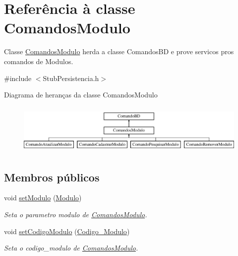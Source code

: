 \hypertarget{class_comandos_modulo}{
\section{\-Referência à classe \-Comandos\-Modulo}
\label{class_comandos_modulo}
}


\-Classe \hyperlink{class_comandos_modulo}{\-Comandos\-Modulo} herda a classe \-Comandos\-B\-D e prove servicos pros comandos de \-Modulos.  




{\ttfamily \#include $<$\-Stub\-Persistencia.\-h$>$}

\-Diagrama de heranças da classe \-Comandos\-Modulo\begin{figure}[H]
\begin{center}
\leavevmode
\includegraphics[height=2.456140cm]{class_comandos_modulo}
\end{center}
\end{figure}
\subsection*{\-Membros públicos}
\begin{DoxyCompactItemize}
\item 
void \hyperlink{class_comandos_modulo_a7518c90fde0ffe5cee985e91124f2955}{set\-Modulo} (\hyperlink{class_modulo}{\-Modulo})
\begin{DoxyCompactList}\small\item\em \-Seta o parametro modulo de \hyperlink{class_comandos_modulo}{\-Comandos\-Modulo}. \end{DoxyCompactList}\item 
void \hyperlink{class_comandos_modulo_a9e4b91e8c55c47700fa1e7dc1cfca94b}{set\-Codigo\-Modulo} (\hyperlink{class_codigo___modulo}{\-Codigo\-\_\-\-Modulo})
\begin{DoxyCompactList}\small\item\em \-Seta o codigo\-\_\-modulo de \hyperlink{class_comandos_modulo}{\-Comandos\-Modulo}. \end{DoxyCompactList}\end{DoxyCompactItemize}
